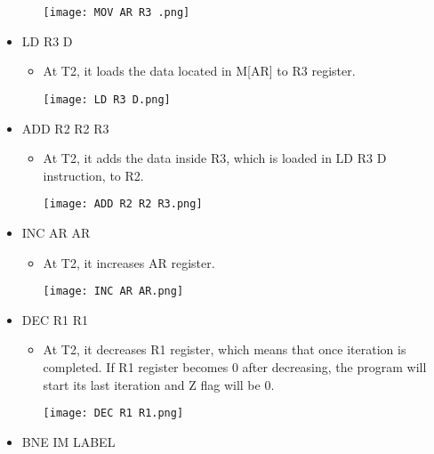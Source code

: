 \documentclass[pdftex,12pt,a4paper]{article}
\begin{document}
\begin{itemize}
\begin{itemize}
\begin{center}
            \texttt{[image: MOV AR R3 .png]}\newline
        	\label{fig1}
        \end{center}
    \end{itemize}
    \item LD R3 D
    \begin{itemize}
        \item At T2, it loads the data located in M[AR] to R3 register.
        \begin{center}
            \texttt{[image: LD R3 D.png]}\newline
        	\label{fig1}
        \end{center}
    \end{itemize}
    \item ADD R2 R2 R3
    \begin{itemize}
        \item At T2, it adds the data inside R3, which is loaded in LD R3 D instruction, to R2.
        \begin{center}
            \texttt{[image: ADD R2 R2 R3.png]}\newline
        	\label{fig1}
        \end{center}
    \end{itemize}
    \item INC AR AR
    \begin{itemize}
        \item At T2, it increases AR register.
        \begin{center}
            \texttt{[image: INC AR AR.png]}\newline
        	\label{fig1}
        \end{center}
    \end{itemize}
    \item DEC R1 R1
    \begin{itemize}
        \item At T2, it decreases R1 register, which means that once iteration is completed. If R1 register becomes 0 after decreasing, the program will start its last iteration and Z flag will be 0.
        \begin{center}
            \texttt{[image: DEC R1 R1.png]}\newline
        	\label{fig1}
        \end{center}
    \end{itemize}
    \item BNE IM LABEL

\end{itemize}
\end{document}
